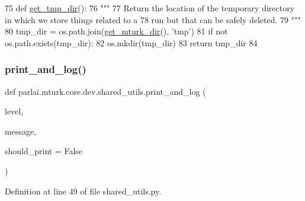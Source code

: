 \begin{DoxyCode}
75 \textcolor{keyword}{def }\hyperlink{namespaceparlai_1_1mturk_1_1core_1_1shared__utils_aa0c7ddb9db866e2f19ec6a83112fc9d2}{get\_tmp\_dir}():
76     \textcolor{stringliteral}{"""}
77 \textcolor{stringliteral}{    Return the location of the temporary directory in which we store things related to a}
78 \textcolor{stringliteral}{    run but that can be safely deleted.}
79 \textcolor{stringliteral}{    """}
80     tmp\_dir = os.path.join(\hyperlink{namespaceparlai_1_1mturk_1_1core_1_1shared__utils_aabd480fc6090e1fa769ff3926f7e842d}{get\_mturk\_dir}(), \textcolor{stringliteral}{'tmp'})
81     \textcolor{keywordflow}{if} \textcolor{keywordflow}{not} os.path.exists(tmp\_dir):
82         os.mkdir(tmp\_dir)
83     \textcolor{keywordflow}{return} tmp\_dir
84 \end{DoxyCode}
\mbox{\label{namespaceparlai_1_1mturk_1_1core_1_1dev_1_1shared__utils_aaf34fac6f7340bd67e9cb62283bc3a28}} 
\subsubsection{\texorpdfstring{print\+\_\+and\+\_\+log()}{print\_and\_log()}}
{\footnotesize\ttfamily def parlai.\+mturk.\+core.\+dev.\+shared\+\_\+utils.\+print\+\_\+and\+\_\+log (\begin{DoxyParamCaption}\item[{}]{level,  }\item[{}]{message,  }\item[{}]{should\+\_\+print = {\ttfamily False} }\end{DoxyParamCaption})}



Definition at line 49 of file shared\+\_\+utils.\+py.


